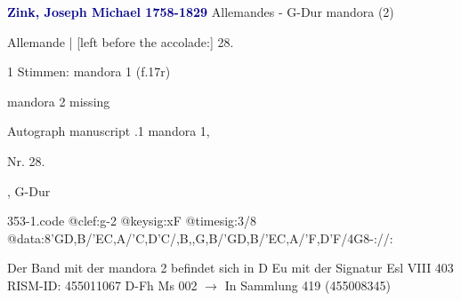 \documentclass[twocolumn]{book}
\begin{document}
\newline \par \vspace{7pt} \textcolor{darkblue}{\textbf{Zink, Joseph Michael  1758-1829}}
\newline Allemandes - G-Dur
\newline mandora (2)
\newline \begin{itshape}[f.17r, at left:] Allemande | [left before the accolade:] 28.\end{itshape} 
\newline \textcolor{darkblue}{}  1 Stimmen: mandora 1  (f.17r)
\newline \begin{small} mandora 2 missing\end{small} 
\newline Autograph manuscript
.1  mandora 1, \begin{itshape}Nr. 28.\end{itshape}, G-Dur  
\begin{filecontents*}{353-1.code}
@clef:g-2
@keysig:xF
@timesig:3/8
@data:8'GD,B/'EC,A/'C,D'C/,B,,G,B/'GD,B/'EC,A/'F,D'F/4G8-://:
\end{filecontents*}
\newline
%
\newline Der Band mit der mandora 2 befindet sich in D Eu mit der Signatur Esl VIII 403
\newline RISM-ID: 455011067
\newline D-Fh  Ms 002
\newline $\rightarrow$ In Sammlung 419 (455008345)
      
\end{document}
